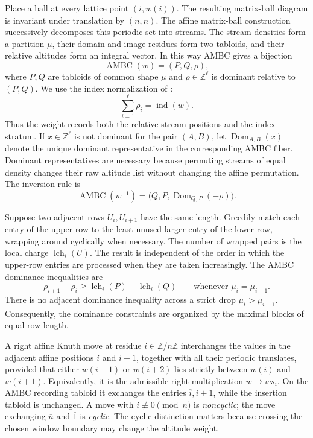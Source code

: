\documentclass[11pt]{article}
\theoremstyle{definition}
\theoremstyle{remark}
\newcommand{\Z}{\mathbb Z}
\newcommand{\AMBC}{\operatorname{AMBC}}
\newcommand{\ol}[1]{\overline{#1}}
\newcommand{\ind}{\operatorname{ind}}
\newcommand{\lch}{\operatorname{lch}}
\newcommand{\Dom}{\operatorname{Dom}}
\begin{document}
Place a ball at every lattice point \((i,w(i))\).  The resulting matrix-ball diagram
is invariant under translation by \((n,n)\).  The affine matrix-ball construction
successively decomposes this periodic set into streams.  The stream densities form a
partition \(\mu\), their domain and image residues form two tabloids, and their relative
altitudes form an integral vector.  In this way AMBC gives a bijection
\cite[Theorems~5.1, 5.11, and~5.12]{CPY18}
\begin{equation}\label{eq:AMBC}
                         \AMBC(w)=(P,Q,\rho),
\end{equation}
where \(P,Q\) are tabloids of common shape \(\mu\) and \(\rho\in\Z^\ell\) is dominant
relative to \((P,Q)\).  We use the index normalization of
\cite[Theorem~10.3 and Lemma~10.6]{CPY18}:
\begin{equation}\label{eq:rho-index}
                         \sum_{i=1}^{\ell}\rho_i=\ind(w).
\end{equation}
Thus the weight records both the relative stream positions and the index stratum.
If \(x\in\Z^\ell\) is not dominant for the pair \((A,B)\), let
\(\Dom_{A,B}(x)\) denote the unique dominant representative in the corresponding
AMBC fiber.  Dominant representatives are necessary because permuting streams of equal
density changes their raw altitude list without changing the affine permutation.
The inversion rule is \cite[Proposition~3.1]{CLP18}
\begin{equation}\label{eq:AMBC-inverse}
 \AMBC(w^{-1})=
 \bigl(Q,P,\Dom_{Q,P}(-\rho)\bigr).
\end{equation}

Suppose two adjacent rows \(U_i,U_{i+1}\) have the same length.  Greedily match each
entry of the upper row to the least unused larger entry of the lower row, wrapping around
cyclically when necessary.  The number of wrapped pairs is the local charge
\(\lch_i(U)\).  The result is independent of the order in which the upper-row entries
are processed when they are taken increasingly.  The AMBC dominance inequalities are
\cite[Definition~5.9 and Theorem~5.10]{CLP18}
\begin{equation}\label{eq:AMBC-dominance}
 \rho_{i+1}-\rho_i\ge\lch_i(P)-\lch_i(Q)
 \qquad\text{whenever }\mu_i=\mu_{i+1}.
\end{equation}
There is no adjacent dominance inequality across a strict drop
\(\mu_i>\mu_{i+1}\).  Consequently, the dominance constraints are organized by the
maximal blocks of equal row length.

A right affine Knuth move at residue \(i\in\Z/n\Z\) interchanges the values in the
adjacent affine positions \(i\) and \(i+1\), together with all their periodic
translates, provided that either \(w(i-1)\) or \(w(i+2)\) lies strictly between
\(w(i)\) and \(w(i+1)\).  Equivalently, it is the admissible right multiplication
\(w\mapsto ws_i\).  On the AMBC recording tabloid it exchanges the entries
\(\ol i,\ol{i+1}\), while the insertion tabloid is unchanged.  A move with
\(i\not\equiv0\pmod n\) is \emph{noncyclic}; the move exchanging \(\ol n\)
and \(\ol1\) is \emph{cyclic}.  The cyclic distinction matters because crossing the
chosen window boundary may change the altitude weight.
\end{document}

